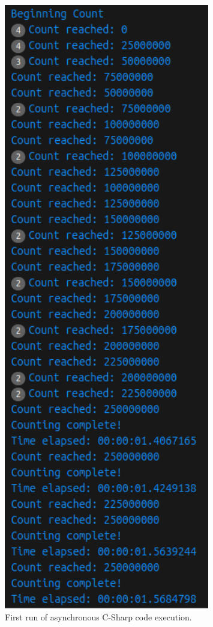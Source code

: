 \documentclass[12pt,a4paper]{article}
\begin{document}
\begin{figure}[htbp]
    \centering
    \includegraphics[width=0.8\textwidth]{../async_records/results_cs/result_1.png}
    \caption{First run of asynchronous C-Sharp code execution.}
    \label{fig:C-Sharp-async-runtime-1}
\end{figure}
\end{document}
